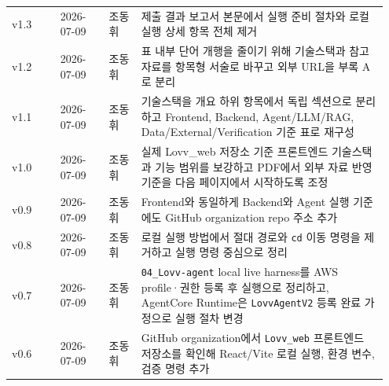 \documentclass[12pt,a4paper]{article}
\newcommand{\DocNeedspace}[1]{\par\ifdim\dimexpr\pagegoal-\pagetotal\relax<#1\newpage\fi}
\renewcommand{\arraystretch}{1.35}
\begin{document}
\DocNeedspace{32\baselineskip}
\begin{footnotesize}
\setlength{\tabcolsep}{3pt}
\setlength{\extrarowheight}{1pt}
\renewcommand{\arraystretch}{1.48}
\begin{longtable}{@{}>{\centering\arraybackslash}m{0.125\linewidth}>{\centering\arraybackslash}m{0.125\linewidth}>{\centering\arraybackslash}m{0.083\linewidth}>{\RaggedRight\arraybackslash}m{0.614\linewidth}@{}}
\toprule
\multicolumn{1}{>{\centering\arraybackslash}m{0.125\linewidth}}{\textbf{버전}} & \multicolumn{1}{>{\centering\arraybackslash}m{0.125\linewidth}}{\textbf{날짜}} & \multicolumn{1}{>{\centering\arraybackslash}m{0.083\linewidth}}{\textbf{작성자}} & \multicolumn{1}{>{\centering\arraybackslash}m{0.614\linewidth}}{\textbf{변경 내용}} \\
\midrule
\endhead
v1.3 & {\footnotesize 2026-\allowbreak{}07-\allowbreak{}09} & 조동휘 & 제출 결과 보고서 본문에서 실행 준비 절차와 로컬 실행 상세 항목 전체 제거 \\
v1.2 & {\footnotesize 2026-\allowbreak{}07-\allowbreak{}09} & 조동휘 & 표 내부 단어 개행을 줄이기 위해 기술스택과 참고자료를 항목형 서술로 바꾸고 외부 URL을 부록 A로 분리 \\
v1.1 & {\footnotesize 2026-\allowbreak{}07-\allowbreak{}09} & 조동휘 & 기술스택을 개요 하위 항목에서 독립 섹션으로 분리하고 Frontend, Backend, Agent/LLM/RAG, Data/External/Verification 기준 표로 재구성 \\
v1.0 & {\footnotesize 2026-\allowbreak{}07-\allowbreak{}09} & 조동휘 & 실제 Lovv\_web 저장소 기준 프론트엔드 기술스택과 기능 범위를 보강하고 PDF에서 외부 자료 반영 기준을 다음 페이지에서 시작하도록 조정 \\
v0.9 & {\footnotesize 2026-\allowbreak{}07-\allowbreak{}09} & 조동휘 & Frontend와 동일하게 Backend와 Agent 실행 기준에도 GitHub organization repo 주소 추가 \\
v0.8 & {\footnotesize 2026-\allowbreak{}07-\allowbreak{}09} & 조동휘 & 로컬 실행 방법에서 절대 경로와 \texttt{cd} 이동 명령을 제거하고 실행 명령 중심으로 정리 \\
v0.7 & {\footnotesize 2026-\allowbreak{}07-\allowbreak{}09} & 조동휘 & \texttt{04\_\allowbreak{}Lovv-\allowbreak{}agent} local live harness를 AWS profile·권한 등록 후 실행으로 정리하고, AgentCore Runtime은 \texttt{Lovv\allowbreak{}Agent\allowbreak{}V2} 등록 완료 가정으로 실행 절차 변경 \\
v0.6 & {\footnotesize 2026-\allowbreak{}07-\allowbreak{}09} & 조동휘 & GitHub organization에서 \texttt{Lovv\_\allowbreak{}web} 프론트엔드 저장소를 확인해 React/Vite 로컬 실행, 환경 변수, 검증 명령 추가 \\

\end{longtable}
\end{footnotesize}
\end{document}
